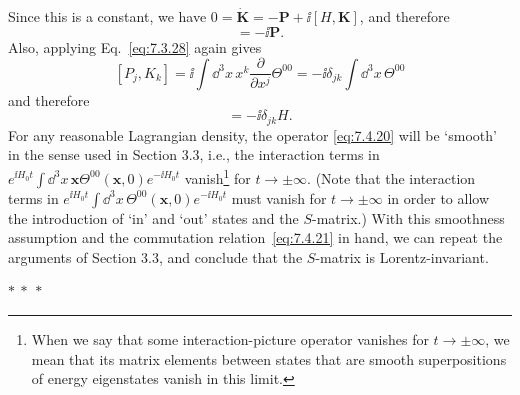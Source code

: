 Since this is a constant, we have
$0=\dot{\mathbf{K}}=-\mathbf{P}+\ii[H,\mathbf{K}]$, and therefore
\begin{equation}
[H,\mathbf{K}]=-\ii\mathbf{P}.
\tag{7.4.21}\label{eq:7.4.21}
\end{equation}
Also, applying Eq.~\eqref{eq:7.3.28} again gives
\[
[P_j,K_k]=\ii\int \dd^3x\,x^k\frac{\partial}{\partial x^j}\Theta^{00}
=-\ii\delta_{jk}\int \dd^3x\,\Theta^{00}
\]
and therefore
\begin{equation}
[P_j,K_k]=-\ii\delta_{jk}H.
\tag{7.4.22}\label{eq:7.4.22}
\end{equation}
For any reasonable Lagrangian density, the operator \eqref{eq:7.4.20} will be `smooth'
in the sense used in Section 3.3, i.e., the interaction terms in
$e^{\ii H_0t}\int \dd^3x\,\mathbf{x}\Theta^{00}(\mathbf{x},0)e^{-\ii H_0t}$
vanish\footnote{When we say that some interaction-picture operator vanishes
for $t\to\pm\infty$, we mean that its matrix elements between states that are
smooth superpositions of energy eigenstates vanish in this limit.} for
$t\to\pm\infty$. (Note that the interaction terms in
$e^{\ii H_0t}\int \dd^3x\,\Theta^{00}(\mathbf{x},0)e^{-\ii H_0t}$ must vanish for
$t\to\pm\infty$ in order to allow the introduction of `in' and `out' states
and the $S$-matrix.) With this smoothness assumption and the commutation
relation~\eqref{eq:7.4.21} in hand, we can repeat the arguments of Section 3.3, and
conclude that the $S$-matrix is Lorentz-invariant.

\begin{center}
$*\ *\ *$
\end{center}

